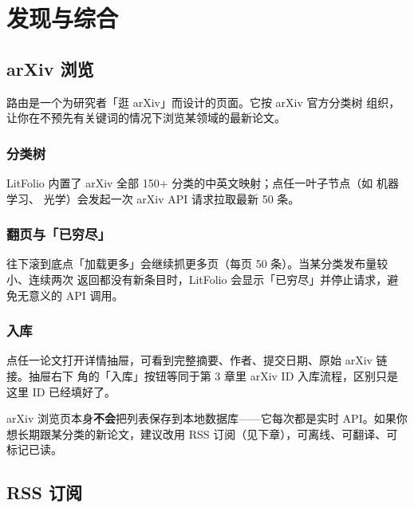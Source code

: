 \part{发现与综合}

\chapter{arXiv 浏览}
\label{ch:browse}

 路由是一个为研究者「逛 arXiv」而设计的页面。它按 arXiv 官方分类树
组织，让你在不预先有关键词的情况下浏览某领域的最新论文。

\section{分类树}


LitFolio 内置了 arXiv 全部 150+ 分类的中英文映射；点任一叶子节点（如 
机器学习、 光学）会发起一次 arXiv API 请求拉取最新 50 条。

\section{翻页与「已穷尽」}

往下滚到底点「加载更多」会继续抓更多页（每页 50 条）。当某分类发布量较小、连续两次
返回都没有新条目时，LitFolio 会显示「已穷尽」并停止请求，避免无意义的 API 调用。

\section{入库}

点任一论文打开详情抽屉，可看到完整摘要、作者、提交日期、原始 arXiv 链接。抽屉右下
角的「入库」按钮等同于第 3 章里 arXiv ID 入库流程，区别只是这里 ID 已经填好了。

\begin{tipbox}
arXiv 浏览页本身\textbf{不会}把列表保存到本地数据库——它每次都是实时 API。如果你
想长期跟某分类的新论文，建议改用 RSS 订阅（见下章），可离线、可翻译、可标记已读。
\end{tipbox}

\chapter{RSS 订阅}
\label{ch:feeds}

